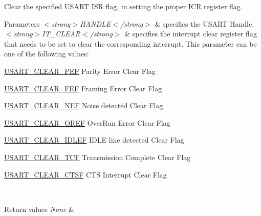 Clear the specified U\+S\+A\+RT I\+SR flag, in setting the proper I\+CR register flag. 


\begin{DoxyParams}{Parameters}
{\em $<$strong$>$\+H\+A\+N\+D\+L\+E$<$/strong$>$} & specifies the U\+S\+A\+RT Handle. \\
\hline
{\em $<$strong$>$\+I\+T\+\_\+\+C\+L\+E\+A\+R$<$/strong$>$} & specifies the interrupt clear register flag that needs to be set to clear the corresponding interrupt. This parameter can be one of the following values\+: \begin{DoxyItemize}
\item \hyperlink{group___u_s_a_r_t___i_t___c_l_e_a_r___flags_gaf83c3d570a430dfd1a7e7a8b583736f2}{U\+S\+A\+R\+T\+\_\+\+C\+L\+E\+A\+R\+\_\+\+P\+EF} Parity Error Clear Flag \item \hyperlink{group___u_s_a_r_t___i_t___c_l_e_a_r___flags_ga9aa038b779783f685fbc834ebf4c3077}{U\+S\+A\+R\+T\+\_\+\+C\+L\+E\+A\+R\+\_\+\+F\+EF} Framing Error Clear Flag \item \hyperlink{group___u_s_a_r_t___i_t___c_l_e_a_r___flags_ga6c4b527c1b6ba5a01bbf6d6d3c6d6784}{U\+S\+A\+R\+T\+\_\+\+C\+L\+E\+A\+R\+\_\+\+N\+EF} Noise detected Clear Flag \item \hyperlink{group___u_s_a_r_t___i_t___c_l_e_a_r___flags_ga3f17bca944fa3409626872985e722dbd}{U\+S\+A\+R\+T\+\_\+\+C\+L\+E\+A\+R\+\_\+\+O\+R\+EF} Over\+Run Error Clear Flag \item \hyperlink{group___u_s_a_r_t___i_t___c_l_e_a_r___flags_gad9927597dca4f88a05c0d5151049470a}{U\+S\+A\+R\+T\+\_\+\+C\+L\+E\+A\+R\+\_\+\+I\+D\+L\+EF} I\+D\+LE line detected Clear Flag \item \hyperlink{group___u_s_a_r_t___i_t___c_l_e_a_r___flags_ga138392691d138fd7687e93fa8ec9cfda}{U\+S\+A\+R\+T\+\_\+\+C\+L\+E\+A\+R\+\_\+\+T\+CF} Transmission Complete Clear Flag \item \hyperlink{group___u_s_a_r_t___i_t___c_l_e_a_r___flags_ga75f4e0fb00423650cde6e4cd8f33c9f0}{U\+S\+A\+R\+T\+\_\+\+C\+L\+E\+A\+R\+\_\+\+C\+T\+SF} C\+TS Interrupt Clear Flag \end{DoxyItemize}
\\
\hline
\end{DoxyParams}

\begin{DoxyRetVals}{Return values}
{\em None} & \\
\hline
\end{DoxyRetVals}
\mbox{\label{group___u_s_a_r_t___exported___macros_ga740fe9f08804ae46a8421a4ecc81a734}} 
